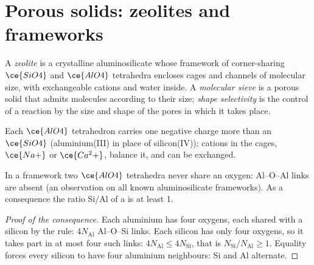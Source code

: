 \section{Porous solids: zeolites and frameworks}

\begin{definition}[Zeolites]\label{def:b3:inorganic-materials:zeolite}
A \emph{zeolite} is a crystalline aluminosilicate whose
framework of corner-sharing $\ce{SiO4}$ and $\ce{AlO4}$ tetrahedra encloses cages and
channels of molecular size, with exchangeable cations and water inside. A
\emph{molecular sieve} is a porous solid that admits
molecules according to their size; \emph{shape selectivity}
is the control of a reaction by the size and shape of the pores in
which it takes place.
\end{definition}

Each $\ce{AlO4}$ tetrahedron carries one negative charge more than an $\ce{SiO4}$
(aluminium(III) in place of silicon(IV)); cations in the cages, $\ce{Na+}$ or $\ce{Ca^2+}$,
balance it, and can be exchanged.

\begin{proposition}\label{prop:b3:inorganic-materials:lowenstein}
In a  framework two $\ce{AlO4}$ tetrahedra never share an oxygen: Al--O--Al links
are absent (an observation on all known aluminosilicate frameworks). As a
consequence the ratio Si/Al of a  is at least 1.
\end{proposition}

\begin{proof}[Proof of the consequence]
Each aluminium has four oxygens, each shared with a silicon by the rule:
$4N_{\mathrm{Al}}$ Al--O--Si links. Each silicon has only four oxygens, so it takes part in
at most four such links: $4N_{\mathrm{Al}} \le 4N_{\mathrm{Si}}$, that is $N_{\mathrm{Si}}/N_{\mathrm{Al}} \ge 1$. Equality forces every
silicon to have four aluminium neighbours: Si and Al alternate.
\end{proof}

